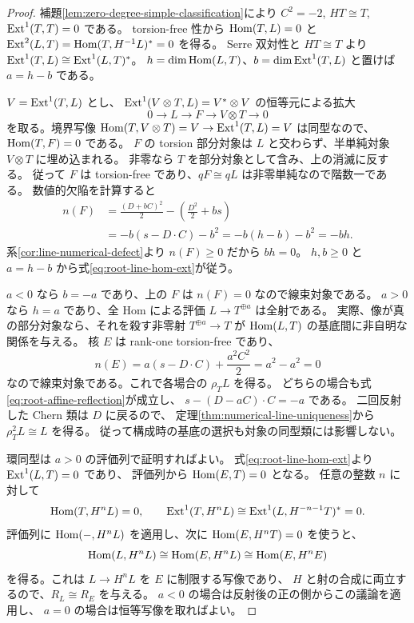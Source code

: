 \begin{proof}
補題\ref{lem:zero-degree-simple-classification}により
$C^2=-2$, $HT\cong T$, $\operatorname{Ext}^1(T,T)=0$ である。
torsion-free 性から $\operatorname{Hom}(T,L)=0$ と
$\operatorname{Ext}^2(L,T)=\operatorname{Hom}(T,H^{-1}L)^*=0$ を得る。
Serre 双対性と $HT\cong T$ より
$\operatorname{Ext}^1(T,L)\cong\operatorname{Ext}^1(L,T)^*$。
$h=\dim\operatorname{Hom}(L,T)$、$b=\dim\operatorname{Ext}^1(T,L)$ と置けば $a=h-b$ である。

$V=\operatorname{Ext}^1(T,L)$ とし、
$\operatorname{Ext}^1(V\otimes T,L)=V^*\otimes V$ の恒等元による拡大
\[
 0\longrightarrow L\longrightarrow F\longrightarrow V\otimes T
 \longrightarrow0
\]
を取る。境界写像 $\operatorname{Hom}(T,V\otimes T)=V\to\operatorname{Ext}^1(T,L)=V$ は同型なので、
$\operatorname{Hom}(T,F)=0$ である。
$F$ の torsion 部分対象は $L$ と交わらず、半単純対象 $V\otimes T$ に埋め込まれる。
非零なら $T$ を部分対象として含み、上の消滅に反する。
従って $F$ は torsion-free であり、$qF\cong qL$ は非零単純なので階数一である。
数値的欠陥を計算すると
\[
 \begin{aligned}
 n(F)
 &=\frac{(D+bC)^2}{2}-\left(\frac{D^2}{2}+bs\right)\\
 &=-b(s-D\cdot C)-b^2=-b(h-b)-b^2=-bh.
 \end{aligned}
\]
系\ref{cor:line-numerical-defect}より $n(F)\ge0$ だから $bh=0$。
$h,b\ge0$ と $a=h-b$ から式\eqref{eq:root-line-hom-ext}が従う。

$a<0$ なら $b=-a$ であり、上の $F$ は $n(F)=0$ なので線束対象である。
$a>0$ なら $h=a$ であり、全 Hom による評価 $L\to T^{\oplus a}$ は全射である。
実際、像が真の部分対象なら、それを殺す非零射 $T^{\oplus a}\to T$ が
$\operatorname{Hom}(L,T)$ の基底間に非自明な関係を与える。
核 $E$ は rank-one torsion-free であり、
\[
 n(E)=a(s-D\cdot C)+\frac{a^2C^2}{2}=a^2-a^2=0
\]
なので線束対象である。これで各場合の $\rho_TL$ を得る。
どちらの場合も式\eqref{eq:root-affine-reflection}が成立し、
$s-(D-aC)\cdot C=-a$ である。
二回反射した Chern 類は $D$ に戻るので、
定理\ref{thm:numerical-line-uniqueness}から $\rho_T^2L\cong L$ を得る。
従って構成時の基底の選択も対象の同型類には影響しない。

環同型は $a>0$ の評価列で証明すればよい。
式\eqref{eq:root-line-hom-ext}より $\operatorname{Ext}^1(L,T)=0$ であり、
評価列から $\operatorname{Hom}(E,T)=0$ となる。
任意の整数 $n$ に対して
\[
 \operatorname{Hom}(T,H^nL)=0,\qquad
 \operatorname{Ext}^1(T,H^nL)\cong\operatorname{Ext}^1(L,H^{-n-1}T)^*=0.
\]
評価列に $\operatorname{Hom}(-,H^nL)$ を適用し、次に
$\operatorname{Hom}(E,H^nT)=0$ を使うと、
\[
 \operatorname{Hom}(L,H^nL)\cong\operatorname{Hom}(E,H^nL)\cong\operatorname{Hom}(E,H^nE)
\]
を得る。これは $L\to H^nL$ を $E$ に制限する写像であり、
$H$ と射の合成に両立するので、$R_L\cong R_E$ を与える。
$a<0$ の場合は反射後の正の側からこの議論を適用し、
$a=0$ の場合は恒等写像を取ればよい。
\end{proof}


